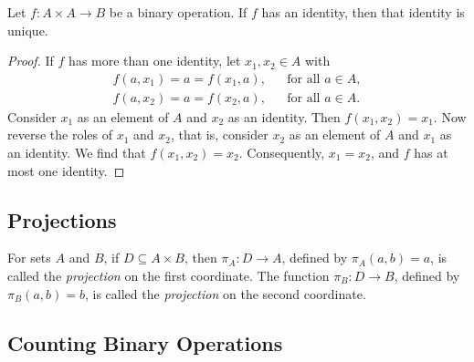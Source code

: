 \documentclass[11pt]{article}
\begin{document}
    Let \(f : A \times A \rightarrow B\) be a binary operation. If $f$ has an identity, then that identity is unique.
    \begin{proof}
        If $f$ has more than one identity, let \(x_1, x_2 \in A\) with
        \begin{align*}
            f(a, x_1) = a = f(x_1,a), && \text{for all } a \in A, \\
            f(a, x_2) = a = f(x_2,a), && \text{for all } a \in A.
        \end{align*}
        Consider \(x_1\) as an element of $A$ and $x_2$ as an identity. Then \(f(x_1,x_2) = x_1\). Now reverse the roles of \(x_1\) and \(x_2\), that is, consider \(x_2\) as an element of $A$ and $x_1$ as an identity. We find that \(f(x_1,x_2) = x_2\). Consequently, \(x_1 = x_2\), and $f$ has at most one identity.
    \end{proof}

    \subsection{Projections}

    For sets $A$ and $B$, if \(D \subseteq A \times B\), then \(\pi_A : D \rightarrow A\), defined by \(\pi_A (a,b) = a\), is called the \emph{projection} on the first coordinate. The function \(\pi_B : D \rightarrow B\), defined by \(\pi_B (a,b) = b\), is called the \emph{projection} on the second coordinate.

    \subsection{Counting Binary Operations}
\end{document}
